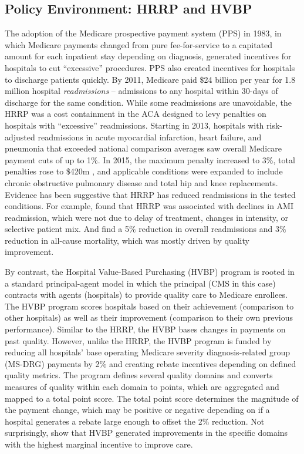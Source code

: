 \documentclass[12pt]{article}
\begin{document}
\subsection{Policy Environment: HRRP and HVBP}
The adoption of the Medicare prospective payment system (PPS) in 1983, in which Medicare payments changed from pure fee-for-service to a capitated amount for each inpatient stay depending on diagnosis, generated incentives for hospitals to cut ``excessive'' procedures. PPS also created incentives for hospitals to discharge patients quickly.  By 2011, Medicare paid $\$$24 billion per year for 1.8 million hospital \textit{readmissions} -- admissions to any hospital within 30-days of discharge for the same condition.  While some readmissions are unavoidable, the HRRP was a cost containment in the ACA designed to levy penalties on hospitals with ``excessive'' readmissions.  Starting in 2013, hospitals with risk-adjusted readmissions in acute myocardial infarction, heart failure, and pneumonia that exceeded national comparison averages saw overall Medicare payment cuts of up to 1$\%$.   In 2015, the maximum penalty increased to 3\%, total penalties rose to \$420m \citep{rau2015}, and applicable conditions were expanded to include chronic obstructive pulmonary disease and total hip and knee replacements.  Evidence has been suggestive that HRRP has reduced readmissions in the tested conditions.  For example, \cite{mellor2016} found that HRRP was associated with declines in AMI readmission, which were not due to delay of treatment, changes in intensity, or selective patient mix. And \cite{gupta2017} find a 5$\%$ reduction in overall readmissions and 3$\%$ reduction in all-cause mortality, which was mostly driven by quality improvement.

By contrast, the Hospital Value-Based Purchasing (HVBP) program is rooted in a standard principal-agent model in which the principal (CMS in this case) contracts with agents (hospitals) to provide quality care to Medicare enrollees. The HVBP program scores hospitals based on their achievement (comparison to other hospitals) as well as their improvement (comparison to their own previous performance).  Similar to the HRRP, the HVBP bases changes in payments on past quality.  However, unlike the HRRP, the HVBP program is funded by reducing all hospitals' base operating Medicare severity diagnosis-related group (MS-DRG) payments by 2$\%$ and creating rebate incentives depending on defined quality metrics.  The program defines several quality domains and converts measures of quality within each domain to points, which are aggregated and mapped to a total point score.  The total point score determines the magnitude of the payment change, which may be positive or negative depending on if a hospital generates a rebate large enough to offset the 2$\%$ reduction.  Not surprisingly, \cite{norton2017} show that HVBP generated improvements in the specific domains with the highest marginal incentive to improve care.
\end{document}
